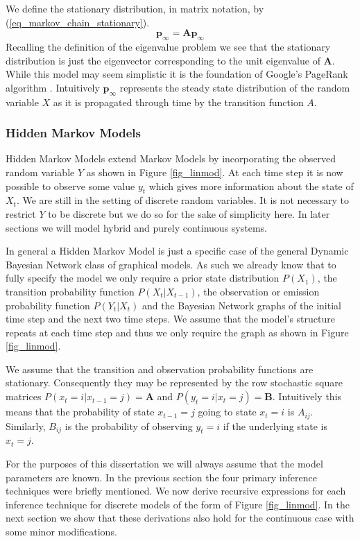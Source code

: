 \documentclass[../masters.tex]{subfiles}
\begin{document}
We define the stationary distribution, in matrix notation, by (\ref{eq_markov_chain_stationary}).
\begin{equation}
\mathbf{p}_{\infty} = \mathbf{A}\mathbf{p}_{\infty}
\label{eq_markov_chain_stationary}
\end{equation}
Recalling the definition of the eigenvalue problem we see that the stationary distribution is just the eigenvector corresponding to the unit eigenvalue of $\mathbf{A}$. While this model may seem simplistic it is the foundation of Google's PageRank algorithm \cite{google}.  Intuitively $\mathbf{p}_\infty$ represents the steady state distribution of the random variable $X$ as it is propagated through time by the transition function $A$.

\subsubsection{Hidden Markov Models}
Hidden Markov Models extend Markov Models by incorporating the observed random variable $Y$ as shown in Figure \ref{fig_linmod}. At each time step it is now possible to observe some value $y_t$ which gives more information about the state of $X_t$. We are still in the setting of discrete random variables. It is not necessary to restrict $Y$ to be discrete but we do so for the sake of simplicity here. In later sections we will model hybrid and purely continuous systems. 

In general a Hidden Markov Model is just a specific case of the general Dynamic Bayesian Network class of graphical models. As such we already know that to fully specify the model we only require a prior state distribution $P(X_1)$, the transition probability function $P(X_t|X_{t-1})$, the observation or emission probability function $P(Y_t|X_t)$ and the Bayesian Network graphs of the initial time step and the next two time steps. We assume that the model's structure repeats at each time step and thus we only require the graph as shown in Figure \ref{fig_linmod}. 

We assume that the transition and observation probability functions are stationary. Consequently they may be represented by the row stochastic square matrices $P(x_t=i|x_{t-1}=j) = \mathbf{A}$ and $P(y_t=i|x_t=j) = \mathbf{B}$. Intuitively this means that the probability of state $x_{t-1}=j$ going to state $x_{t} = i$ is $A_{ij}$. Similarly, $B_{ij}$ is the probability of observing $y_t=i$ if the underlying state is $x_t=j$.

For the purposes of this dissertation we will always assume that the model parameters are known. In the previous section the four primary inference techniques were briefly mentioned. We now derive recursive expressions for each inference technique for discrete models of the form of Figure \ref{fig_linmod}. In the next section we show that these derivations also hold for the continuous case with some minor modifications.
\end{document}
